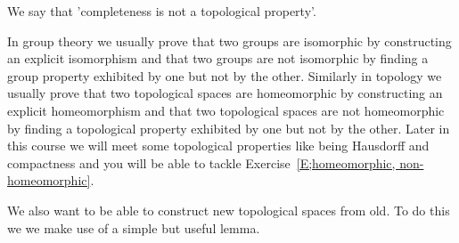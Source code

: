 We say that 'completeness is not a topological property'.

In group theory we usually prove that two groups are isomorphic
by constructing an explicit isomorphism and that two groups
are not isomorphic by finding a group property
exhibited by one but not by the other. Similarly in
topology we usually prove that two topological spaces
are homeomorphic
by constructing an explicit homeomorphism and that two
topological spaces
are not homeomorphic by finding a topological property
exhibited by one but not by the other. Later in this course
we will meet some topological properties like being
Hausdorff and compactness and you will be able to
tackle Exercise~\ref{E;homeomorphic, non-homeomorphic}.

We also want to be able to construct new topological
spaces from old. To do this we we make use of a simple
but useful lemma.

